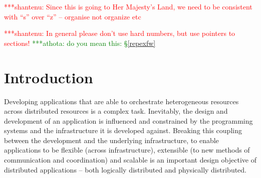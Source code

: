 \documentclass{rspublic}
\newcommand{\jhanote}[1]{ {\textcolor{red} { ***shantenu: #1 }}}
\newcommand{\athotanote}[1]{ {\textcolor{green} { ***athota: #1 }}}
\newcommand{\athotanote}[1]{}
\newcommand{\jhanote}[1]{}
\begin{document}
\begin{abstract}{Replica-Exchange, SAGA, Large-Scale, Production}

\end{abstract}

\jhanote{Since this is going to Her Majesty's Land, we need to be
  consistent with ``s'' over ``z'' -- organise not organize etc}

\jhanote{In general please don't use hard numbers, but use pointers to
  sections!}
\athotanote{do you mean this: \S\ref{repexfw}}
\section{Introduction}
Developing applications that are able to orchestrate heterogeneous
resources across distributed resources is a complex task.  Inevitably,
the design and development of an application is influenced and
constrained by the programming systems and the infrastructure it is
developed against. Breaking this coupling between the development and
the underlying infrastructure, to enable applications to be flexible
(across infrastructure), extensible (to new methods of communication
and coordination) and scalable is an important design objective of
distributed applications -- both logically distributed and physically
distributed.
\end{document}
